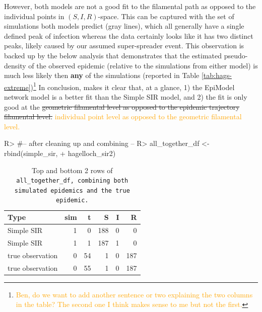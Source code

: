 \documentclass[
  shortnames]{jss}
\begin{document}
However, both models are not a good fit to the filamental path as
opposed to the individual points in \((S, I, R)\)-space. This can be
captured with the set of simulations both models predict (gray lines),
which all generally have a single defined peak of infection whereas the
data certainly looks like it has two distinct peaks, likely caused by
our assumed super-spreader event. This observation is backed up by the
below analysis that demonstrates that the estimated pseudo-density of
the observed epidemic (relative to the simulations from either model) is
much less likely then \textbf{any} of the simulations (reported in Table
\ref{tab:hags-extreme})\footnote{\textcolor{orange}{Ben, do we want to add another sentence or two explaining the two columns in the table?  The second one I think makes sense to me but not the first.}}
In conclusion,  makes it clear that, at a glance, 1) the
EpiModel network model is a better fit than the Simple SIR model, and 2)
the fit is only good at the
\sout{geometric filamental level as opposed to the epidemic trajectory filamental level.}
\textcolor{orange}{individual point level as opposed to the geometric filamental level.}

\begin{CodeChunk}
\begin{CodeInput}
R> #-- after cleaning up and combining --
R> all_together_df <- rbind(simple_sir,
+                          hagelloch_sir2)
\end{CodeInput}
\end{CodeChunk}

\begin{CodeChunk}
\begin{table}[!h]

\caption{\label{tab:cif-all-together-df}Top and bottom 2 rows of \tt{all\_together\_df}\textnormal{, combining both simulated epidemics and the true epidemic.}}
\centering
\begin{tabular}[t]{lrrrrr}
\toprule
Type & sim & t & S & I & R\\
\midrule
Simple SIR & 1 & 0 & 188 & 0 & 0\\
Simple SIR & 1 & 1 & 187 & 1 & 0\\
true observation & 0 & 54 & 1 & 0 & 187\\
true observation & 0 & 55 & 1 & 0 & 187\\
\bottomrule
\end{tabular}
\end{table}

\end{CodeChunk}
\end{document}
